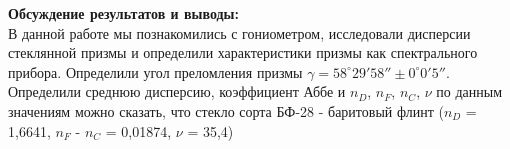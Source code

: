 \documentclass[a4paper, 12pt]{article}%
\begin{document}
	\textbf{Обсуждение результатов и выводы: }\\
	
	В данной работе мы познакомились с гониометром, исследовали дисперсии стеклянной призмы и определили характеристики призмы как
	спектрального прибора.
	Определили угол преломления призмы $\gamma =  58^\circ 29'58''\pm 0^\circ 0'5''$.
	Определили среднюю дисперсию, коэффициент Аббе и $n_D$, $n_F$, $n_C$, $\nu$ по данным значениям можно сказать, что стекло сорта БФ-28 - баритовый флинт ($n_D$ = 1,6641, $n_F$ - $n_C$ = 0,01874, $\nu$ = 35,4)
	
	
	
	
\end{document}
